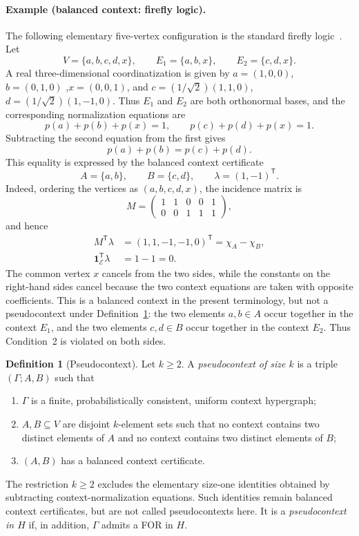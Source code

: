 \documentclass[
  twocolumn,
  aps,
  pra,
  floatfix,
  amsmath,amssymb,
  longbibliography
]{revtex4-2}
\theoremstyle{definition}
\newtheorem{definition}[theorem]{Definition}
\theoremstyle{remark}
\newcommand{\E}{\mathcal E}
\newcommand{\one}{\mathbf 1}
\begin{document}
\paragraph{Example (balanced context: firefly logic).}
The following elementary five-vertex configuration is the standard firefly
logic~\cite{cohen}.  Let
\[
 V=\{a,b,c,d,x\},
 \qquad
 E_1=\{a,b,x\},
 \qquad
 E_2=\{c,d,x\}.
\]
A real three-dimensional coordinatization is given by
\(a=(1,0,0)\),  \(b=(0,1,0)\) ,\(x=(0,0,1)\),
and
\(c=(1/\sqrt{2})(1,1,0)\),
\(d=(1/\sqrt{2})(1,-1,0)
\).
Thus $E_1$ and $E_2$ are both orthonormal bases, and the corresponding
normalization equations are
\[
 p(a)+p(b)+p(x)=1,
 \qquad
 p(c)+p(d)+p(x)=1.
\]
Subtracting the second equation from the first gives
\[
 p(a)+p(b)=p(c)+p(d).
\]
This equality is expressed by the balanced context certificate
\[
 A=\{a,b\},
 \qquad
 B=\{c,d\},
 \qquad
 \lambda=(1,-1)^{\mathsf T}.
\]
Indeed, ordering the vertices as $(a,b,c,d,x)$, the incidence matrix is
\[
 M=
 \begin{pmatrix}
  1&1&0&0&1\\
  0&0&1&1&1
 \end{pmatrix},
\]
and hence
\[
 \begin{split}
  M^{\mathsf T}\lambda
  &= (1,1,-1,-1,0)^{\mathsf T}
   =\chi_A-\chi_B,\\
  \one_\E^{\mathsf T}\lambda&=1-1=0.
 \end{split}
\]
The common vertex $x$ cancels from the two sides, while the constants on
the right-hand sides cancel because the two context equations are taken
with opposite coefficients.  This is a balanced context in the present
terminology, but not a pseudocontext under Definition~\ref{def:pseudocontext}:
the two elements $a,b\in A$ occur together in the context $E_1$, and the two
elements $c,d\in B$ occur together in the context $E_2$.  Thus Condition~2
is violated on both sides.

\begin{definition}[Pseudocontext]
\label{def:pseudocontext}
Let $k\ge2$.  A \emph{pseudocontext of size $k$} is a triple
$(\Gamma;A,B)$ such that
\begin{enumerate}
  \item $\Gamma$ is a finite, probabilistically consistent, uniform context
        hypergraph;
  \item $A,B\subseteq V$ are disjoint $k$-element sets such that no context
        contains two distinct elements of $A$ and no context contains two
        distinct elements of $B$;
  \item $(A,B)$ has a balanced context certificate.
\end{enumerate}
The restriction $k\ge2$ excludes the elementary size-one identities
obtained by subtracting context-normalization equations.  Such identities
remain balanced context certificates, but are not called pseudocontexts
here.
It is a \emph{pseudocontext in $H$} if, in addition, $\Gamma$ admits a FOR
in $H$.
\end{definition}
\end{document}
